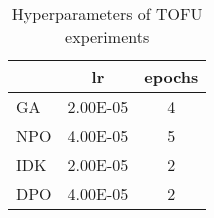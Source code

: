 \begin{table}[h]
    \centering
    \begin{tabular}{lcc}
        \hline
        & \textbf{lr} & \textbf{epochs} \\
        \hline
        GA  & 2.00E-05 & 4 \\
        NPO & 4.00E-05 & 5 \\
        IDK & 2.00E-05 & 2 \\
        DPO & 4.00E-05 & 2 \\
        \hline
    \end{tabular}
    \caption{Hyperparameters of TOFU experiments}
    \label{tab:hyperparams-tofu}
\end{table}